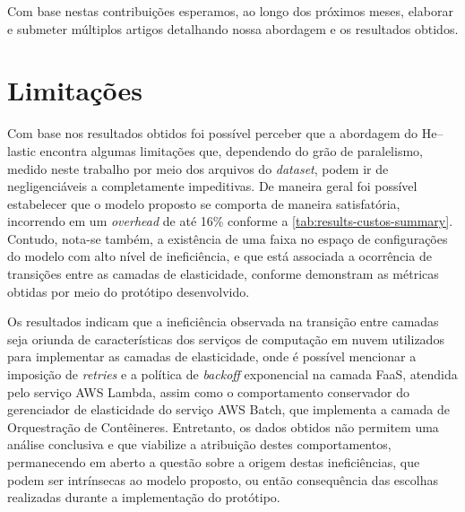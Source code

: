 \documentclass[english,brazilian]{UNISINOSmonografia} %
\begin{document}
Com base nestas contribuições esperamos, ao longo dos próximos meses, elaborar e submeter múltiplos artigos detalhando nossa abordagem e os resultados obtidos.



\section{Limitações}


Com base nos resultados obtidos foi possível perceber que a abordagem do \textsf{He}--lastic encontra algumas limitações que, dependendo do grão de paralelismo, medido neste trabalho por meio dos arquivos do \textit{dataset}, podem ir de negligenciáveis a completamente impeditivas.
%
De maneira geral foi possível estabelecer que o modelo proposto se comporta de maneira satisfatória, incorrendo em um \textit{overhead} de até 16\% conforme a \autoref{tab:results-custos-summary}.
%
Contudo, nota-se também, a existência de uma faixa no espaço de configurações do modelo com alto nível de ineficiência, e que está associada a ocorrência de transições entre as camadas de elasticidade, conforme demonstram as métricas obtidas por meio do protótipo desenvolvido.


Os resultados indicam que a ineficiência observada na transição entre camadas seja oriunda de características dos serviços de computação em nuvem utilizados para implementar as camadas de elasticidade, onde é possível mencionar a imposição de \textit{retries} e a política de \textit{backoff} exponencial na camada FaaS, atendida pelo serviço AWS Lambda, assim como o comportamento conservador do gerenciador de elasticidade do serviço AWS Batch, que implementa a camada de Orquestração de Contêineres.
%
Entretanto, os dados obtidos não permitem uma análise conclusiva e que viabilize a atribuição destes comportamentos, permanecendo em aberto a questão sobre a origem destas ineficiências, que podem ser intrínsecas ao modelo proposto, ou então consequência das escolhas realizadas durante a implementação do protótipo.
%
\end{document}
